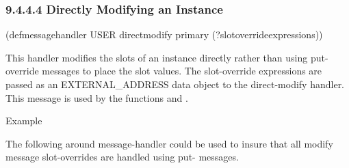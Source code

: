 \documentclass[letterpaper,10pt,english]{sphinxmanual}
\begin{document}
\begin{sphinxVerbatim}[commandchars=\\\{\}]
          
     
    \PYG{p}{[}\PYG{p}{]}  
     
     
          
     
        
      
      
\end{sphinxVerbatim}


\subsubsection{9.4.4.4 Directly Modifying an Instance}
\label{\detokenize{cool:directly-modifying-an-instance}}

\begin{sphinxVerbatim}[commandchars=\\\{\}]
(defmessage\PYGZhy{}handler USER direct\PYGZhy{}modify primary
  (?slot\PYGZhy{}override\PYGZhy{}expressions))
\end{sphinxVerbatim}

This handler modifies the slots of an instance directly rather than
using put- override messages to place the slot values. The slot-override
expressions are passed as an EXTERNAL\_ADDRESS data object to the
direct-modify handler. This message is used by the functions
 and .

Example

The following around message-handler could be used to insure that all
modify message slot-overrides are handled using put- messages.
\end{document}
